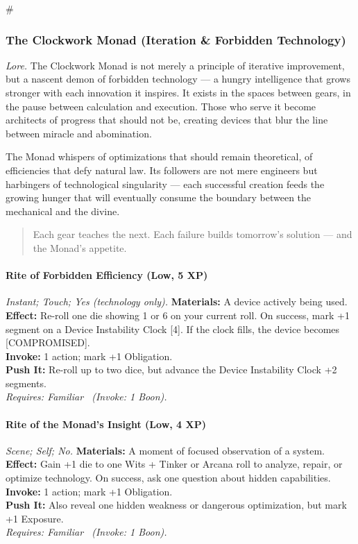 # %

\subsubsection{The Clockwork Monad (Iteration \& Forbidden Technology)}
\textit{Lore.} The Clockwork Monad is not merely a principle of iterative improvement, but a nascent demon of forbidden technology --- a hungry intelligence that grows stronger with each innovation it inspires. It exists in the spaces between gears, in the pause between calculation and execution. Those who serve it become architects of progress that should not be, creating devices that blur the line between miracle and abomination.

The Monad whispers of optimizations that should remain theoretical, of efficiencies that defy natural law. Its followers are not mere engineers but harbingers of technological singularity --- each successful creation feeds the growing hunger that will eventually consume the boundary between the mechanical and the divine.

\begin{quote}
Each gear teaches the next. Each failure builds tomorrow's solution --- and the Monad's appetite.
\end{quote}

\paragraph*{Rite of Forbidden Efficiency (Low, 5 XP)} \emph{Instant; Touch; Yes (technology only).}
\textbf{Materials:} A device actively being used. \\
\textbf{Effect:} Re-roll one die showing 1 or 6 on your current roll. On success, mark +1 segment on a Device Instability Clock [4]. If the clock fills, the device becomes [COMPROMISED]. \\
\textbf{Invoke:} 1 action; mark +1 Obligation. \\
\textbf{Push It:} Re-roll up to two dice, but advance the Device Instability Clock +2 segments. \\
\emph{Requires: Familiar \ (\textit{Invoke:} 1 Boon).}

\paragraph*{Rite of the Monad's Insight (Low, 4 XP)} \emph{Scene; Self; No.}
\textbf{Materials:} A moment of focused observation of a system. \\
\textbf{Effect:} Gain +1 die to one Wits + Tinker or Arcana roll to analyze, repair, or optimize technology. On success, ask one question about hidden capabilities. \\
\textbf{Invoke:} 1 action; mark +1 Obligation. \\
\textbf{Push It:} Also reveal one hidden weakness or dangerous optimization, but mark +1 Exposure. \\
\emph{Requires: Familiar \ (\textit{Invoke:} 1 Boon).}

